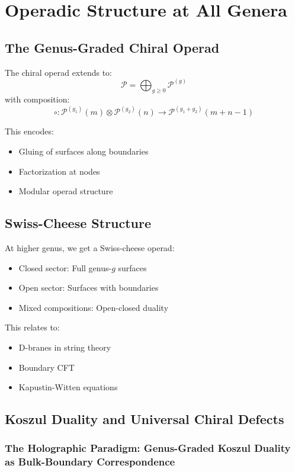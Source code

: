 \chapter{Operadic Structure at All Genera}

\section{The Genus-Graded Chiral Operad}

The chiral operad extends to:
$$\mathcal{P} = \bigoplus_{g \geq 0} \mathcal{P}^{(g)}$$
with composition:
$$\circ: \mathcal{P}^{(g_1)}(m) \otimes \mathcal{P}^{(g_2)}(n) \to \mathcal{P}^{(g_1+g_2)}(m+n-1)$$

This encodes:
\begin{itemize}
\item Gluing of surfaces along boundaries
\item Factorization at nodes
\item Modular operad structure
\end{itemize}

\section{Swiss-Cheese Structure}

At higher genus, we get a Swiss-cheese operad:
\begin{itemize}
\item Closed sector: Full genus-$g$ surfaces
\item Open sector: Surfaces with boundaries
\item Mixed compositions: Open-closed duality
\end{itemize}

This relates to:
\begin{itemize}
\item D-branes in string theory
\item Boundary CFT
\item Kapustin-Witten equations
\end{itemize}

\section{Koszul Duality and Universal Chiral Defects}\label{sec:koszul-defects}

\subsection{The Holographic Paradigm: Genus-Graded Koszul Duality as Bulk-Boundary Correspondence}

